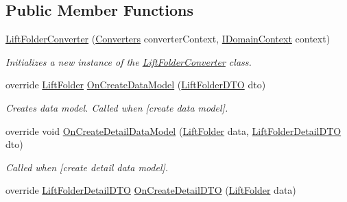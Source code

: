 \subsection*{Public Member Functions}
\begin{DoxyCompactItemize}
\item 
\mbox{\hyperlink{class_bar_none_1_1_shared_1_1_data_converters_1_1_lift_folder_converter_a6b2f8da11be24dd236ab042648ea239c}{Lift\+Folder\+Converter}} (\mbox{\hyperlink{class_bar_none_1_1_shared_1_1_data_converters_1_1_converters}{Converters}} converter\+Context, \mbox{\hyperlink{interface_bar_none_1_1_shared_1_1_core_1_1_i_domain_context}{I\+Domain\+Context}} context)
\begin{DoxyCompactList}\small\item\em Initializes a new instance of the \mbox{\hyperlink{class_bar_none_1_1_shared_1_1_data_converters_1_1_lift_folder_converter}{Lift\+Folder\+Converter}} class. \end{DoxyCompactList}\item 
override \mbox{\hyperlink{class_bar_none_1_1_shared_1_1_domain_model_1_1_lift_folder}{Lift\+Folder}} \mbox{\hyperlink{class_bar_none_1_1_shared_1_1_data_converters_1_1_lift_folder_converter_aeb15c1339f51dd7d84c4b10d6287f4af}{On\+Create\+Data\+Model}} (\mbox{\hyperlink{class_bar_none_1_1_shared_1_1_data_transfer_1_1_lift_folder_d_t_o}{Lift\+Folder\+D\+TO}} dto)
\begin{DoxyCompactList}\small\item\em Creates data model. Called when \mbox{[}create data model\mbox{]}. \end{DoxyCompactList}\item 
override void \mbox{\hyperlink{class_bar_none_1_1_shared_1_1_data_converters_1_1_lift_folder_converter_aea47338314d7d8f0d074bdc2d26c0e92}{On\+Create\+Detail\+Data\+Model}} (\mbox{\hyperlink{class_bar_none_1_1_shared_1_1_domain_model_1_1_lift_folder}{Lift\+Folder}} data, \mbox{\hyperlink{class_bar_none_1_1_shared_1_1_data_transfer_1_1_lift_folder_detail_d_t_o}{Lift\+Folder\+Detail\+D\+TO}} dto)
\begin{DoxyCompactList}\small\item\em Called when \mbox{[}create detail data model\mbox{]}. \end{DoxyCompactList}\item 
override \mbox{\hyperlink{class_bar_none_1_1_shared_1_1_data_transfer_1_1_lift_folder_detail_d_t_o}{Lift\+Folder\+Detail\+D\+TO}} \mbox{\hyperlink{class_bar_none_1_1_shared_1_1_data_converters_1_1_lift_folder_converter_aeb386f13365a1835856fba2308b48c2d}{On\+Create\+Detail\+D\+TO}} (\mbox{\hyperlink{class_bar_none_1_1_shared_1_1_domain_model_1_1_lift_folder}{Lift\+Folder}} data)

\end{DoxyCompactItemize}
